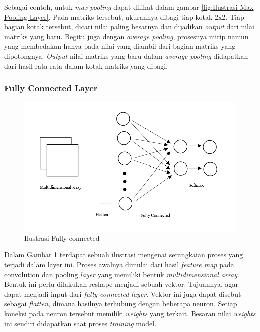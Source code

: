 Sebagai contoh, untuk \emph{max pooling} dapat dilihat dalam gambar \ref{fig:Ilustrasi Max Pooling Layer}. Pada matriks tersebut, ukurannya dibagi tiap kotak 2x2. Tiap bagian kotak tersebut, dicari nilai paling besarnya dan dijadikan \emph{output} dari nilai matriks yang baru. Begitu juga dengan \emph{average pooling}, prosesnya mirip namun yang membedakan hanya pada nilai yang diambil dari bagian matriks yang dipotongnya. \emph{Output} nilai matriks yang baru dalam \emph{average pooling} didapatkan dari hasil rata-rata dalam kotak matriks yang dibagi. 

\subsubsection{Fully Connected Layer}

\begin{figure} [ht] \centering  
  \includegraphics[scale=0.7]{gambar/fully-connected.png}
  \caption{Ilustrasi Fully connected}
  \label{fig:Ilustrasi Fully connected}
\end{figure}

Dalam Gambar \ref{fig:Ilustrasi Fully connected} terdapat sebuah ilustrasi mengenai serangkaian proses yang terjadi dalam layer ini. Proses awalnya dimulai dari hasil \emph{feature map} pada convolution dan pooling \emph{layer} yang memiliki bentuk \emph{multidimensional array}. Bentuk ini perlu dilakukan reshape menjadi sebuah vektor. Tujuannya, agar dapat menjadi input dari \emph{fully connected layer}. Vektor ini juga dapat disebut sebagai \emph{flatten}, dimana hasilnya terhubung dengan beberapa neuron. Setiap koneksi pada neuron tersebut memiliki \emph{weights} yang terkait. Besaran nilai \emph{weights} ini sendiri didapatkan saat proses \emph{training} model. 


